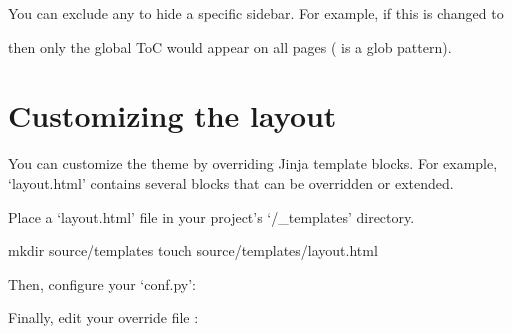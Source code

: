 \documentclass[letterpaper,10pt,english]{sphinxmanual}
\begin{document}
You can exclude any to hide a specific sidebar. For example, if this is changed to

\begin{sphinxVerbatim}[commandchars=\\\{\}]
  
     \PYG{p}{[}\PYG{p}{]}
\end{sphinxVerbatim}

then only the global ToC would appear on all pages (\sphinxcode{\sphinxupquote{**}} is a glob pattern).


\section{Customizing the layout}
\label{\detokenize{customization:customizing-the-layout}}
You can customize the theme by overriding Jinja template blocks. For example,
‘layout.html’ contains several blocks that can be overridden or extended.

Place a ‘layout.html’ file in your project’s ‘/\_templates’ directory.

\begin{sphinxVerbatim}[commandchars=\\\{\}]
mkdir source/\PYGZus{}templates
touch source/\PYGZus{}templates/layout.html
\end{sphinxVerbatim}

Then, configure your ‘conf.py’:

\begin{sphinxVerbatim}[commandchars=\\\{\}]
  \PYG{p}{[}\PYG{p}{]}
\end{sphinxVerbatim}

Finally, edit your override file :

\begin{sphinxVerbatim}[commandchars=\\\{\}]
   

\PYGZhy{}   
  
\PYGZhy{}  
\end{sphinxVerbatim}
\end{document}
